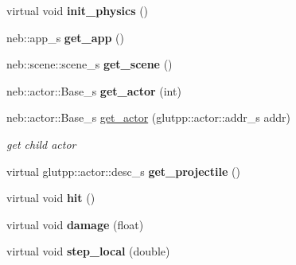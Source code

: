 \begin{DoxyCompactItemize}
\item 
\hypertarget{classneb_1_1Actor_1_1Base_a731bb18d1c9ea82bffbb2a21142bdd27}{
virtual void {\bfseries init\_\-physics} ()}
\label{classneb_1_1Actor_1_1Base_a731bb18d1c9ea82bffbb2a21142bdd27}

\item 
\hypertarget{classneb_1_1Actor_1_1Base_a7a11ae4e93b715a5e6224ef0d68df53a}{
neb::app\_\-s {\bfseries get\_\-app} ()}
\label{classneb_1_1Actor_1_1Base_a7a11ae4e93b715a5e6224ef0d68df53a}

\item 
\hypertarget{classneb_1_1Actor_1_1Base_af007ee3818f0fee14102de1fc403516c}{
neb::scene::scene\_\-s {\bfseries get\_\-scene} ()}
\label{classneb_1_1Actor_1_1Base_af007ee3818f0fee14102de1fc403516c}

\item 
\hypertarget{classneb_1_1Actor_1_1Base_a8ca0c0fffa9e5e2491423258b945a4a4}{
neb::actor::Base\_\-s {\bfseries get\_\-actor} (int)}
\label{classneb_1_1Actor_1_1Base_a8ca0c0fffa9e5e2491423258b945a4a4}

\item 
neb::actor::Base\_\-s \hyperlink{classneb_1_1Actor_1_1Base_a5b89c7f3df49dea66f304d13411dc106}{get\_\-actor} (glutpp::actor::addr\_\-s addr)
\begin{DoxyCompactList}\small\item\em get child actor \item\end{DoxyCompactList}\item 
\hypertarget{classneb_1_1Actor_1_1Base_add23ae5e5518cd28a3d1e4dbdd925327}{
virtual glutpp::actor::desc\_\-s {\bfseries get\_\-projectile} ()}
\label{classneb_1_1Actor_1_1Base_add23ae5e5518cd28a3d1e4dbdd925327}

\item 
\hypertarget{classneb_1_1Actor_1_1Base_a3c1b056cb6adfe4cba9042f1ca51c5d8}{
virtual void {\bfseries hit} ()}
\label{classneb_1_1Actor_1_1Base_a3c1b056cb6adfe4cba9042f1ca51c5d8}

\item 
\hypertarget{classneb_1_1Actor_1_1Base_ac0dff3c4bbbad6e2875ea72c989f8386}{
virtual void {\bfseries damage} (float)}
\label{classneb_1_1Actor_1_1Base_ac0dff3c4bbbad6e2875ea72c989f8386}

\item 
\hypertarget{classneb_1_1Actor_1_1Base_a81a93a73355d20517c8703b070043342}{
virtual void {\bfseries step\_\-local} (double)}
\label{classneb_1_1Actor_1_1Base_a81a93a73355d20517c8703b070043342}


\end{DoxyCompactItemize}
